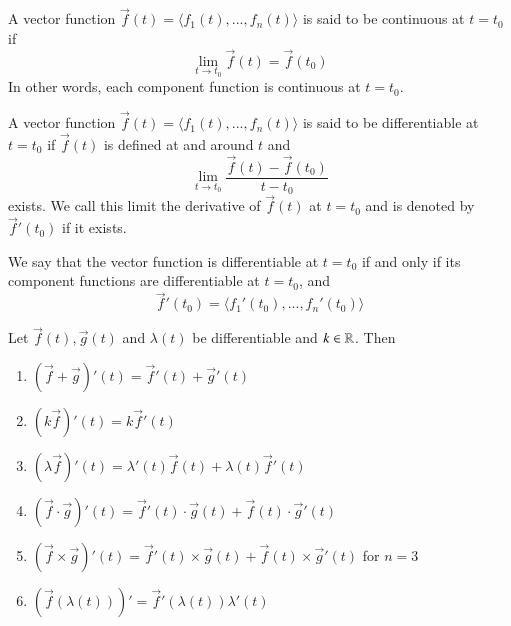 \begin{appendices}
    \begin{defn}[Continuity]
        A vector function $\vec{f}(t) = \langle f_1(t),...,f_n(t)\rangle$ is said to be continuous at $t = t_0$ if \begin{equation}
            \lim\limits_{t\rightarrow t_0}\vec{f}(t) = \vec{f}(t_0)
        \end{equation}
        In other words, each component function is continuous at $t = t_0$.
    \end{defn}

    \begin{defn}[Differentiability]
        A vector function $\vec{f}(t) = \langle f_1(t),...,f_n(t)\rangle$ is said to be differentiable at $t = t_0$ if $\vec{f}(t)$ is defined at and around $t$ and \begin{equation}
            \lim\limits_{t\rightarrow t_0}\frac{\vec{f}(t) - \vec{f}(t_0)}{t - t_0}
        \end{equation}
        exists. We call this limit the derivative of $\vec{f}(t)$ at $t = t_0$ and is denoted by $\vec{f}'(t_0)$ if it exists.
    \end{defn}

    \begin{thm}
        We say that the vector function is differentiable at $t = t_0$ if and only if its component functions are differentiable at $t = t_0$, and \begin{equation}
            \vec{f}'(t_0) = \langle f_1'(t_0),...,f_n'(t_0)\rangle
        \end{equation}
    \end{thm}



    \begin{rmk}
        Let $\vec{f}(t), \vec{g}(t)$ and $\lambda(t)$ be differentiable and $k \in \mathbb R$. Then \begin{enumerate}
            \item $(\vec{f}+\vec{g})'(t) = \vec{f}'(t) + \vec{g}'(t)$
            \item $(k\vec{f})'(t) = k\vec{f}'(t)$
            \item $(\lambda\vec{f})'(t) = \lambda'(t)\vec{f}(t) + \lambda(t)\vec{f}'(t)$
            \item $(\vec{f}\cdot\vec{g})'(t) = \vec{f}'(t)\cdot \vec{g}(t) + \vec{f}(t)\cdot \vec{g}'(t)$
            \item $(\vec{f}\times \vec{g})'(t) = \vec{f}'(t)\times \vec{g}(t) + \vec{f}(t)\times \vec{g}'(t)$ for $n = 3$
            \item $(\vec{f}(\lambda(t)))' = \vec{f}'(\lambda(t))\lambda'(t)$
        \end{enumerate}
    \end{rmk}



\end{appendices}

